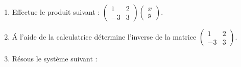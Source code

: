 \documentclass[a4paper,12pt]{book}
\begin{document}
\begin{exercice}[]
\begin{enumerate}[\bfseries 1.]
	\item 	Effectue le produit suivant : $\begin{pmatrix}
	1 & 2 \\ -3 & 3\end{pmatrix}\begin{pmatrix}x\\y\end{pmatrix}$.
	\item 	\'A l'aide de la calculatrice détermine l'inverse de la matrice $\begin{pmatrix}
		1 & 2 \\ -3 & 3\end{pmatrix}$.
	\item Résous le système suivant : 
\end{enumerate}
\end{exercice}
\end{document}
